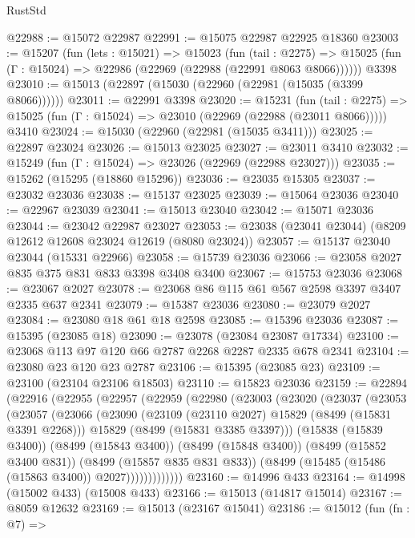 \begin{lexlean}{RustStd}
\begin{coremodule}
@22988 := @15072 @22987
@22991 := @15075 @22987 @22925 @18360
@23003 := @15207
    (fun (lets : @15021) =>
    @15023
      (fun (tail : @2275) =>
      @15025 (fun (Γ : @15024) => @22986 (@22969 (@22988 (@22991 @8063 @8066))))))
    @3398
@23010 := @15013 (@22897 (@15030 (@22960 (@22981 (@15035 (@3399 @8066))))))
@23011 := @22991 @3398
@23020 := @15231
    (fun (tail : @2275) => @15025 (fun (Γ : @15024) => @23010 (@22969 (@22988 (@23011 @8066)))))
    @3410
@23024 := @15030 (@22960 (@22981 (@15035 @3411)))
@23025 := @22897 @23024
@23026 := @15013 @23025
@23027 := @23011 @3410
@23032 := @15249 (fun (Γ : @15024) => @23026 (@22969 (@22988 @23027)))
@23035 := @15262 (@15295 (@18860 @15296))
@23036 := @23035 @15305
@23037 := @23032 @23036
@23038 := @15137 @23025
@23039 := @15064 @23036
@23040 := @22967 @23039
@23041 := @15013 @23040
@23042 := @15071 @23036
@23044 := @23042 @22987 @23027
@23053 := @23038 (@23041 @23044) (@8209 @12612 @12608 @23024 @12619 (@8080 @23024))
@23057 := @15137 @23040 @23044 (@15331 @22966)
@23058 := @15739 @23036
@23066 := @23058 @2027 @835 @375 @831 @833 @3398 @3408 @3400
@23067 := @15753 @23036
@23068 := @23067 @2027
@23078 := @23068 @86 @115 @61 @567 @2598 @3397 @3407 @2335 @637 @2341
@23079 := @15387 @23036
@23080 := @23079 @2027
@23084 := @23080 @18 @61 @18 @2598
@23085 := @15396 @23036
@23087 := @15395 (@23085 @18)
@23090 := @23078 (@23084 @23087 @17334)
@23100 := @23068 @113 @97 @120 @66 @2787 @2268 @2287 @2335 @678 @2341
@23104 := @23080 @23 @120 @23 @2787
@23106 := @15395 (@23085 @23)
@23109 := @23100 (@23104 @23106 @18503)
@23110 := @15823 @23036
@23159 := @22894
    (@22916
      (@22955
        (@22957
          (@22959
            (@22980
              (@23003
                (@23020
                  (@23037
                    (@23053
                      (@23057
                        (@23066
                          (@23090
                            (@23109 (@23110 @2027) @15829 (@8499 (@15831 @3391 @2268)))
                            @15829
                            (@8499 (@15831 @3385 @3397)))
                          (@15838 (@15839 @3400))
                          (@8499 (@15843 @3400))
                          (@8499 (@15848 @3400))
                          (@8499 (@15852 @3400 @831))
                          (@8499 (@15857 @835 @831 @833))
                          (@8499 (@15485 (@15486 (@15863 @3400)) @2027)))))))))))))
@23160 := @14996 @433
@23164 := @14998 (@15002 @433) (@15008 @433)
@23166 := @15013 (@14817 @15014)
@23167 := @8059 @12632
@23169 := @15013 (@23167 @15041)
@23186 := @15012
    (fun (fn : @7) =>

\end{coremodule}
\end{lexlean}
